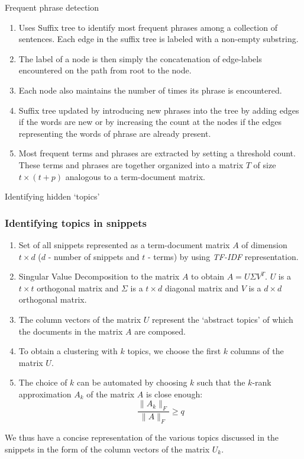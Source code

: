 \documentclass{beamer}
\begin{document}
\begin{frame}{Frequent phrase detection}
\begin{enumerate}
\item Uses Suffix tree to identify most frequent phrases among a
  collection of sentences. Each edge in the suffix tree is labeled
  with a non-empty substring.
\item The label of a node is then simply the concatenation of
  edge-labels encountered on the path from root to the node. 
\item Each node also maintains the number of times its phrase is
  encountered. 
\item Suffix tree updated by introducing new phrases into the tree
  by adding edges if the words are new or by increasing the count at
  the nodes if the edges representing the words of phrase are already
  present.
\item Most frequent terms and phrases are extracted by setting a
  threshold count. These terms and phrases are together organized into
  a matrix $T$ of size $t \times (t+p)$ analogous to a term-document
  matrix.
\end{enumerate}
\end{frame}

\begin{frame}{Identifying hidden `topics'}
\subsubsection{Identifying topics in snippets}
\begin{enumerate}
\item Set of all snippets represented as a term-document matrix $A$ of
  dimension $t \times d$ ($d$ - number of snippets and $t$ - terms) by
  using {\it TF-IDF} representation.
\item Singular Value Decomposition to the matrix $A$ to obtain $A = U
  \Sigma V^T$. $U$ is a $t \times t$ orthogonal matrix and $\Sigma$ is
  a $t \times d$ diagonal matrix and $V$ is a $d \times d$ orthogonal
  matrix. 
\item The column vectors of the matrix $U$ represent the `abstract
  topics' of which the documents in the matrix $A$ are composed.
\item To obtain a clustering with $k$ topics, we choose the first $k$
  columns of the matrix $U$. 
\item The choice of $k$ can be automated by choosing $k$ such that the
  $k$-rank approximation $A_k$ of the matrix $A$ is close enough:
$$
\frac{\|A_k\|_F}{\|A\|_F} \ge q
$$
\end{enumerate}
We thus have a concise representation of the various topics discussed
in the snippets in the form of the column vectors of the matrix $U_k$.
\end{frame}
\end{document}
